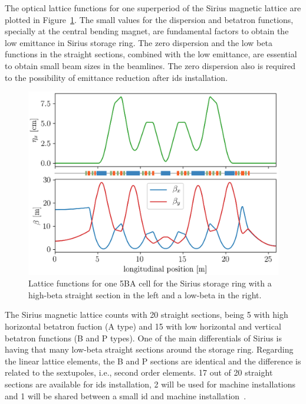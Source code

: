 The optical lattice functions for one superperiod of the Sirius magnetic lattice are plotted in Figure~\ref{fig:twiss_functions}. The small values for the dispersion and betatron functions, specially at the central bending magnet, are fundamental factors to obtain the low emittance in Sirius storage ring. The zero dispersion and the low beta functions in the straight sections, combined with the low emittance, are essential to obtain small beam sizes in the beamlines. The zero dispersion also is required to the possibility of emittance reduction after \glspl{id} installation.
\begin{figure}
    \centering
    \includegraphics[width=\textwidth]{figures/twiss_plot_refine.eps}
    \caption{Lattice functions for one 5BA cell for the Sirius storage ring with a high-beta straight section in the left and a low-beta in the right.}
    \label{fig:twiss_functions}
\end{figure}

The Sirius magnetic lattice counts with 20 straight sections, being 5 with high horizontal betatron fuction (A type) and 15 with low horizontal and vertical betatron functions (B and P types). One of the main differentials of Sirius is having that many low-beta straight sections around the storage ring. Regarding the linear lattice elements, the B and P sections are identical and the difference is related to the sextupoles, i.e., second order elements. 17 out of 20 straight sections are available for \glspl{id} installation, 2 will be used for machine installations and 1 will be shared between a small \gls{id} and machine installation~\cite{liu2019}. 

